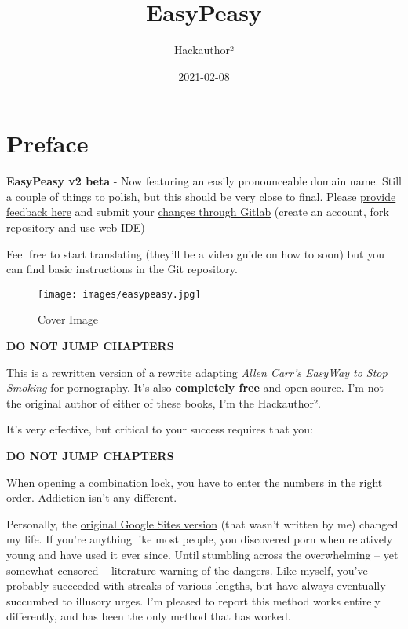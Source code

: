 \documentclass[
]{book}
\title{EasyPeasy}
\author{Hackauthor²}
\date{2021-02-08}
\begin{document}
\maketitle

{
\setcounter{tocdepth}{1}
\tableofcontents
}
\hypertarget{preface}{%
\chapter*{Preface}\label{preface}}

\textbf{EasyPeasy v2 beta} - Now featuring an easily pronounceable domain name. Still a couple of things to polish, but this should be very close to final. Please \href{https://boards.coomer.org/easy/res/1.html}{provide feedback here} and submit your \href{https://gitlab.com/snuggy/easypeasy/}{changes through Gitlab} (create an account, fork repository and use web IDE)

Feel free to start translating (they'll be a video guide on how to soon) but you can find basic instructions in the Git repository.

\begin{figure}
\centering
\texttt{[image: images/easypeasy.jpg]}
\caption{Cover Image}
\end{figure}

{\textbf{DO NOT JUMP CHAPTERS}}

This is a rewritten version of a \href{https://sites.google.com/site/hackbookeasypeasy}{rewrite} adapting \emph{Allen Carr's EasyWay to Stop Smoking} for pornography. It's also \textbf{completely free} and \href{https://gitlab.com/snuggy/easypeasy}{open source}. I'm not the original author of either of these books, I'm the Hackauthor².

It's very effective, but critical to your success requires that you:

{\textbf{DO NOT JUMP CHAPTERS}}

When opening a combination lock, you have to enter the numbers in the right order. Addiction isn't any different.

Personally, the \href{https://sites.google.com/site/hackbookeasypeasy}{original Google Sites version} (that wasn't written by me) changed my life. If you're anything like most people, you discovered porn when relatively young and have used it ever since. Until stumbling across the overwhelming -- yet somewhat censored -- literature warning of the dangers. Like myself, you've probably succeeded with streaks of various lengths, but have always eventually succumbed to illusory urges. I'm pleased to report this method works entirely differently, and has been the only method that has worked.
\end{document}
